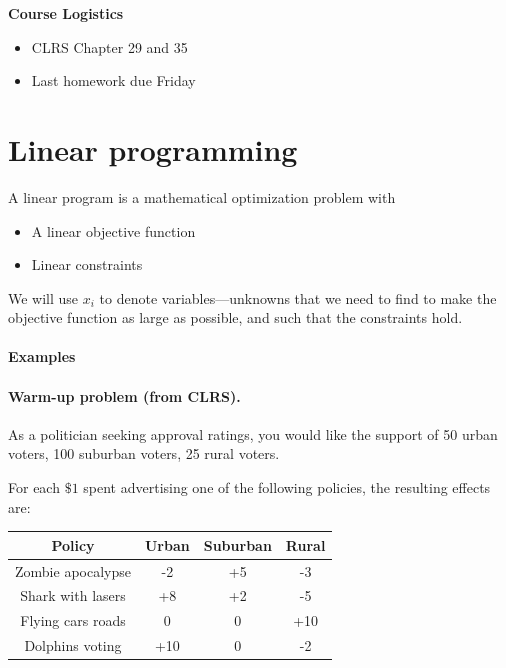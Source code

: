 \documentclass[11  pt]{article}
\begin{document}
	
	\textbf{Course Logistics}
	\begin{itemize}
		\item CLRS Chapter 29 and 35
		\item Last homework due Friday
	\end{itemize}
	
	
		\section{Linear programming}
		
		A linear program is a mathematical optimization problem with 
	\begin{itemize}
		\item A linear objective function
		\item Linear constraints
	\end{itemize}

We will use $x_i$ to denote variables---unknowns that we need to find to make the objective function as large as possible, and such that the constraints hold. \\

\paragraph{Examples} 

\newpage

		
		\paragraph{Warm-up problem (from CLRS).} 
As a politician seeking approval ratings, you would like the
support of 50 urban voters, 100 suburban voters, 25 rural
voters. 
		
For each $\$1$ spent advertising one of the following policies,
the resulting effects are:
		
\begin{center}
\begin{tabular}{|c|c|c|c|}
\hline
\textbf{Policy} & \textbf{Urban} & \textbf{Suburban} & \textbf{Rural} \\
\hline
Zombie apocalypse & -2 & +5 & -3 \\
Shark with lasers & +8 & +2 & -5 \\
Flying cars roads & 0 & 0 & +10 \\
Dolphins voting & +10 & 0 & -2 \\
\hline
\end{tabular}
\end{center}		
\end{document}
